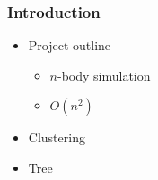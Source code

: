 \begin{frame}
  \frametitle{Introduction}
  \begin{itemize}
      \item Project outline
      \begin{itemize}
          \item $n$-body simulation
          \item $O(n^2)$
      \end{itemize}
      \item Clustering
      \item Tree
  \end{itemize}{}
\end{frame}